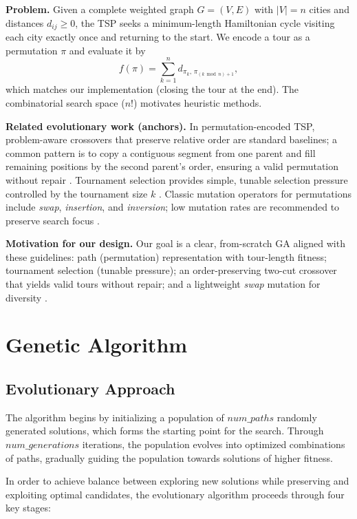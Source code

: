 \documentclass{scrartcl}
\begin{document}
\textbf{Problem.}
Given a complete weighted graph \(G=(V,E)\) with \(|V|=n\) cities and distances \(d_{ij}\!\ge\!0\), the TSP seeks a minimum-length Hamiltonian cycle visiting each city exactly once and returning to the start. We encode a tour as a permutation \(\pi\) and evaluate it by
\[
f(\pi)=\sum_{k=1}^{n} d_{\pi_k,\,\pi_{(k \bmod n)+1}},
\]
which matches our implementation (closing the tour at the end). The combinatorial search space (\(n!\)) motivates heuristic methods.

\textbf{Related evolutionary work (anchors).}
In permutation-encoded TSP, problem-aware crossovers that preserve relative order are standard baselines; a common pattern is to copy a contiguous segment from one parent and fill remaining positions by the second parent’s order, ensuring a valid permutation without repair \cite{Hussain2017_CX2}. Tournament selection provides simple, tunable selection pressure controlled by the tournament size \(k\) \cite{MillerGoldberg1995_Tournament}. Classic mutation operators for permutations include \emph{swap}, \emph{insertion}, and \emph{inversion}; low mutation rates are recommended to preserve search focus \cite{Kumar2012_JGRCS_TSP_GA_Study}.

\textbf{Motivation for our design.}
Our goal is a clear, from-scratch GA aligned with these guidelines: path (permutation) representation with tour-length fitness; tournament selection (tunable pressure); an order-preserving two-cut crossover that yields valid tours without repair; and a lightweight \emph{swap} mutation for diversity \cite{Hussain2017_CX2,MillerGoldberg1995_Tournament,Kumar2012_JGRCS_TSP_GA_Study}.




\section{Genetic Algorithm}
\label{sec:algorithm}

\subsection{Evolutionary Approach}
The algorithm begins by initializing a population of $ num\_paths $ randomly generated solutions, which forms the starting point for the search. Through $ num\_generations $ iterations, the population evolves into optimized combinations of paths, gradually guiding the population towards solutions of higher fitness.

In order to achieve balance between exploring new solutions while preserving and exploiting optimal candidates, the evolutionary algorithm proceeds through four key stages:
\end{document}
